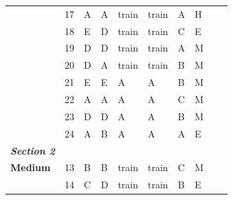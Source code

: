 \documentclass[pageno]{jpaper}
\newcommand{\textbi}[1]{\textbf{\textit{#1}}}
\begin{document}
\begin{table}[]
\begin{tabularx}{\textwidth}{XXXXXXXXXX}
\textbf{}                & 17              & A                       & A                      & train                   & train                   & A                       & H                   \\
\textbf{}                & 18              & E                       & D                      & train                   & train                   & C                       & E                   \\
\textbf{}                & 19              & D                       & D                      & train                   & train                   & A                       & M                   \\
\textbf{}                & 20              & D                       & A                      & train                   & train                   & B                       & M                   \\
\textbf{}                & 21              & E                       & E                      & A                       & A                       & B                       & M                   \\
\textbf{}                & 22              & A                       & A                      & A                       & A                       & C                       & M                   \\
\textbf{}                & 23              & D                       & D                      & A                       & A                       & B                       & M                   \\
\textbf{}                & 24              & A                       & B                      & A                       & A                       & A                       & E                   \\ \midrule
\textbi{Section 2}       &                 &                         &                        &                         &                         &                         &                     \\ \midrule
\textbf{Medium}          & 13              & B                       & B                      & train                   & train                   & C                       & M                   \\
\textbf{}                & 14              & C                       & D                      & train                   & train                   & B                       & E                   \\

\end{tabularx}
\end{table}
\end{document}
